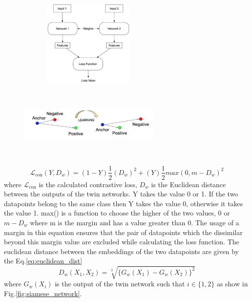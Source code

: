 \begin{figure}
  \centering
  \begin{minipage}[t]{.45\textwidth}
    \centering
    \includegraphics[width=200pt,height=120pt]{pictures/siamese_network.png}
    \label{fig:siamese_network}
  \end{minipage}%
  \hspace{1cm}
  \begin{minipage}[t]{.45\textwidth}
    \centering
    \includegraphics[width=200pt,height=100pt]{pictures/triplet_loss.PNG}
    \label{fig:triplet_loss}
  \end{minipage}
\end{figure}

\begin{equation}
  \label{eq:contrastive_loss}
  \mathcal{L}_{\textrm{con}}(Y,D_{w})= (1-Y)\frac{1}{2}(D_{w})^2 + (Y)\frac{1}{2}{max(0,m-D_{w})}^2
\end{equation}
where $\mathcal{L}_{\textrm{con}}$ is the calculated contrastive loss, $D_{w}$ is the Euclidean distance between the outputs of the twin networks\cite*{siamese_network}. Y takes the value 0 or 1. If the two datapoints belong to the same class then Y takes the value 0, otherwise it takes the value 1\cite*{siamese_network}. max() is a function to choose the higher of the two values, 0 or $m-D_{w}$ where m is the margin and has a value greater than 0\cite*{siamese_network}. The usage of a margin in this equation ensures that the pair of datapoints which the dissimilar beyond this margin value are excluded while calculating the loss function\cite*{siamese_network}. The euclidean distance between the embeddings of the two datapoints are given by the Eq.\ref*{eq:euclidean_dist}\cite*{siamese_network}
\begin{equation}
  \label{eq:euclidean_dist}
  D_{w}(X_{1},X_{2})= \sqrt[2]{\{G_{w}(X_{1}) - G_{w}(X_{2})\}^2}
\end{equation}
where $G_{w}(X_{i})$ is the output of the twin network such that $i \in \{1,2\}$ as show in Fig.\ref*{fig:siamese_network}.

